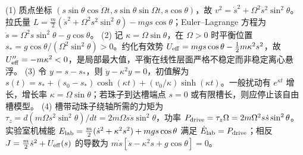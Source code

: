 (1) 质点坐标 \((s\sin\theta\cos\Omega t,s\sin\theta\sin\Omega t,s\cos\theta)\)，故 \(v^2=\dot s^2+\Omega^2s^2\sin^2\theta\)。拉氏量 \(L=\frac m2(\dot s^2+\Omega^2s^2\sin^2\theta)-mgs\cos\theta\)；Euler–Lagrange 方程为 \(\ddot s=\Omega^2s\sin^2\theta-g\cos\theta\)。
(2) 记 \(\kappa=\Omega\sin\theta\)，在 \(\Omega>0\) 时平衡位置 \(s_*=g\cos\theta/(\Omega^2\sin^2\theta)>0\)。约化有效势 \(U_{\rm eff}=mgs\cos\theta-\frac12m\kappa^2s^2\)，故 \(U_{\rm eff}''=-m\kappa^2<0\)，是局部最大值，平衡在线性层面严格不稳定而非稳定离心悬浮。
(3) 令 \(y=s-s_*\)，则 \(\ddot y-\kappa^2y=0\)，初值解为 \(s(t)=s_*+(s_0-s_*)\cosh(\kappa t)+(v_0/\kappa)\sinh(\kappa t)\)。一般扰动有 \(e^{\kappa t}\) 增长，增长率 \(\kappa=\Omega\sin\theta\)；若珠子到达槽端点 \(s=0\) 或有限槽长，则应停止该自由槽模型。
(4) 槽带动珠子绕轴所需的力矩为 \(\tau_z=d(m\Omega s^2\sin^2\theta)/dt=2m\Omega s\dot s\sin^2\theta\)，功率 \(P_{\rm drive}=\tau_z\Omega=2m\Omega^2s\dot s\sin^2\theta\)。实验室机械能 \(E_{\rm lab}=\frac m2(\dot s^2+\kappa^2s^2)+mgs\cos\theta\) 满足 \(\dot E_{\rm lab}=P_{\rm drive}\)；相反 \(J=\frac m2\dot s^2+U_{\rm eff}(s)\) 的导数为 \(m\dot s[\ddot s-\kappa^2s+g\cos\theta]=0\)。

